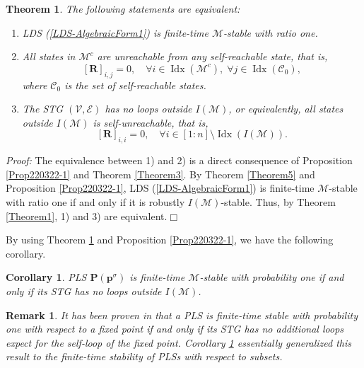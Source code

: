 \documentclass[11pt,onecolumn]{article}
\DeclareMathOperator{\idx}{Idx}
\newtheorem{theorem}{Theorem}
\newtheorem{corollary}{Corollary}
\newtheorem{remark}{Remark}
\begin{document}
   \begin{theorem}\label{Theorem220322-1}
       The following statements are equivalent:
       \begin{enumerate}
         \item LDS (\ref{LDS-AlgebraicForm1}) is finite-time $\mathcal M$-stable with ratio one.
         \item All states in $\mathcal M^c$ are unreachable from any self-reachable state, that is,
             \[[\mathbf R]_{i,j}=0,\quad \forall i\in\idx(\mathcal M^c),\;\forall j\in\idx(\mathcal C_0), \]
   where $\mathcal C_0$ is the set of self-reachable states.
         \item The STG $(\mathcal V,\mathcal E)$ has no loops outside $I(\mathcal M)$, or equivalently, all states outside $I(\mathcal M)$ is self-unreachable, that is,
                \[[\mathbf R]_{i,i}=0,\quad\forall i\in[1:n]\setminus\idx(I(\mathcal M)).\]
       \end{enumerate}
   \end{theorem}

   {\it Proof:} The equivalence between 1) and 2) is a direct consequence of Proposition \ref{Prop220322-1} and Theorem \ref{Theorem3}. By Theorem \ref{Theorem5} and Proposition \ref{Prop220322-1}, LDS (\ref{LDS-AlgebraicForm1}) is finite-time $\mathcal M$-stable with ratio one if and only if it is robustly $I(\mathcal M)$-stable. Thus, by Theorem \ref{Theorem1}, 1) and 3) are equivalent.\hfill $\Box$


   By using Theorem \ref{Theorem220322-1} and Proposition \ref{Prop220322-1}, we have the following corollary.

   \begin{corollary}\label{corollary220322-1}
       PLS $\mathbf P(\boldsymbol p^\sigma)$ is finite-time $\mathcal M$-stable with probability one if and only if its STG has  no loops outside $I(\mathcal M)$.
   \end{corollary}

   \begin{remark}
      It has been proven in \cite{zhu2020finite} that a PLS is finite-time stable with probability one with respect to a fixed point if and only if its STG has no additional loops expect for the self-loop of the fixed point. Corollary \ref{corollary220322-1} essentially generalized this result to the finite-time stability of PLSs with respect to subsets.
   \end{remark}
\end{document}
